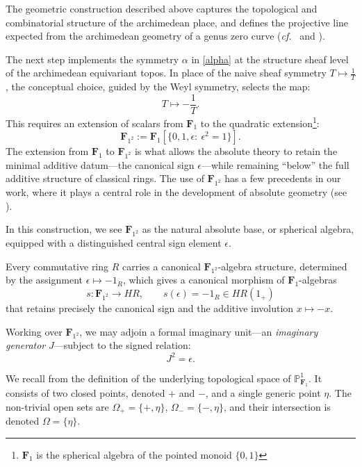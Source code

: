 \documentclass[11pt,a4paper]{article}
\renewcommand{\P}{\mathbb{P}}
\newcommand{\Fone}{\mathbf{F}_{1}}
\newcommand{\Ftwo}{\mathbf{F}_{1^2}}
\def\cf{{\it cf.\/}\ }
\begin{document}
The geometric construction described above captures the topological and
combinatorial structure of the archimedean place, and  defines the  projective line expected from the
archimedean geometry of a genus zero curve (\cf \cite{CC3,CC5} and \cite{S}).\vspace{.05in} 

The next step  implements the symmetry $\alpha$ in \eqref{alpha} at the structure sheaf level of the archimedean equivariant topos. In place of the naive sheaf symmetry $T \mapsto \frac 1T$, the conceptual choice, guided by the Weyl symmetry, selects the map:
\[
T \mapsto -\frac 1T.
\]
This requires an extension of scalars from $\Fone$ to the quadratic extension\footnote{$\Fone$ is the spherical algebra of the pointed monoid $\{0,1\}$}: 
\begin{equation}\label{F2}
\Ftwo:=\Fone[\{0,1,\epsilon:~\epsilon^2 = 1\}].
\end{equation} 
The extension from $\Fone$ to $\Ftwo$ is  what allows the absolute
 theory to retain the minimal additive datum---the canonical sign $\epsilon$---while
remaining ``below'' the full additive structure of classical rings.
The use of $\Ftwo$  has a few precedents in our
work, where it plays a central role in the development of absolute
geometry (see \cite{CC9,CC7}). 

In this construction, we see $\Ftwo$ as the natural absolute base,
or spherical algebra, equipped with a distinguished central sign element
$\epsilon$.

Every commutative ring $R$ carries a canonical $\Ftwo$-algebra structure,
determined by the assignment
$
\epsilon\longmapsto -1_R$, which gives a canonical morphism of $\Fone$-algebras 
\[
s:\Ftwo \to HR, \qquad s(\epsilon)=-1_R\in HR(1_+) 
\]
that retains precisely the canonical sign and the additive involution
$
x\longmapsto -x$.\vspace{.05in}

Working over $\Ftwo$, we may adjoin a formal imaginary unit---an
\emph{imaginary generator} $J$---subject to the signed relation:
\[
J^2=\epsilon.
\]



We recall from \cite{CC10} the definition of the underlying topological space of $\P^1_{\Fone}$. It consists of two closed points, denoted $+$ and $-$, and a single generic point $\eta$. The non-trivial open sets are $\Omega_+ = \{+, \eta\}$, $\Omega_- = \{-, \eta\}$, and their intersection is denoted $\Omega = \{\eta\}$.
\vspace{.05in}
\end{document}
